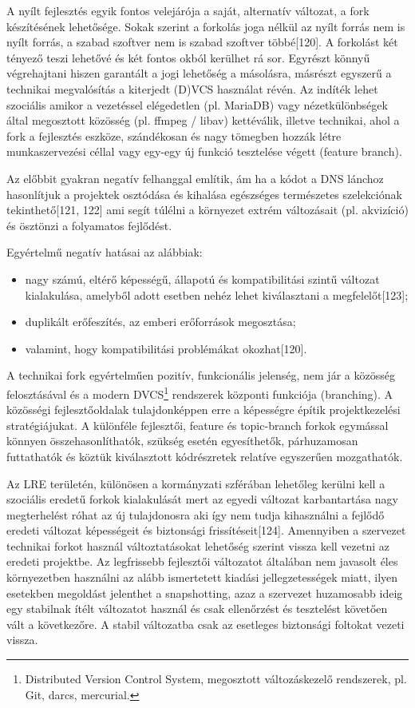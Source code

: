 \documentclass[12pt,magyar,a4paper,oneside]{scrreprt}
\providecommand{\tightlist}{%
  \setlength{\itemsep}{0pt}\setlength{\parskip}{0pt}}
\begin{document}
A nyílt fejlesztés egyik fontos velejárója a saját, alternatív változat,
a fork készítésének lehetősége. Sokak szerint a forkolás joga nélkül az
nyílt forrás nem is nyílt forrás, a szabad szoftver nem is szabad
szoftver többé{[}120{]}. A forkolást két tényező teszi lehetővé és két
fontos okból kerülhet rá sor. Egyrészt könnyű végrehajtani hiszen
garantált a jogi lehetőség a másolásra, másrészt egyszerű a technikai
megvalósítás a kiterjedt (D)VCS használat révén. Az indíték lehet
szociális amikor a vezetéssel elégedetlen (pl. MariaDB) vagy
nézetkülönbségek által megosztott közösség (pl. ffmpeg / libav)
kettéválik, illetve technikai, ahol a fork a fejlesztés eszköze,
szándékosan és nagy tömegben hozzák létre munkaszervezési céllal vagy
egy-egy új funkció tesztelése végett (feature branch).

Az előbbit gyakran negatív felhanggal említik, ám ha a kódot a DNS
lánchoz hasonlítjuk a projektek osztódása és kihalása egészséges
természetes szelekciónak tekinthető{[}121, 122{]} ami segít túlélni a
környezet extrém változásait (pl. akvizíció) és ösztönzi a folyamatos
fejlődést.

Egyértelmű negatív hatásai az alábbiak:

\begin{itemize}
\tightlist
\item
  nagy számú, eltérő képességű, állapotú és kompatibilitási szintű
  változat kialakulása, amelyből adott esetben nehéz lehet kiválasztani
  a megfelelőt{[}123{]};
\item
  duplikált erőfeszítés, az emberi erőforrások megosztása;
\item
  valamint, hogy kompatibilitási problémákat okozhat{[}120{]}.
\end{itemize}

A technikai fork egyértelműen pozitív, funkcionális jelenség, nem jár a
közösség felosztásával és a modern DVCS\footnote{Distributed Version
  Control System, megosztott változáskezelő rendszerek, pl. Git, darcs,
  mercurial.} rendszerek központi funkciója (branching). A közösségi
fejlesztőoldalak tulajdonképpen erre a képességre építik projektkezelési
stratégiájukat. A különféle fejlesztői, feature és topic-branch forkok
egymással könnyen összehasonlíthatók, szükség esetén egyesíthetők,
párhuzamosan futtathatók és köztük kiválasztott kódrészretek relatíve
egyszerűen mozgathatók.

Az LRE területén, különösen a kormányzati szférában lehetőleg kerülni
kell a szociális eredetű forkok kialakulását mert az egyedi változat
karbantartása nagy megterhelést róhat az új tulajdonosra aki így nem
tudja kihasználni a fejlődő eredeti változat képességeit és biztonsági
frissítéseit{[}124{]}. Amennyiben a szervezet technikai forkot használ
változtatásokat lehetőség szerint vissza kell vezetni az eredeti
projektbe. Az legfrissebb fejlesztői változatot általában nem javasolt
éles környezetben használni az alább ismertetett kiadási
jellegzetességek miatt, ilyen esetekben megoldást jelenthet a
snapshotting, azaz a szervezet huzamosabb ideig egy stabilnak ítélt
változatot használ és csak ellenőrzést és tesztelést követően vált a
következőre. A stabil változatba csak az esetleges biztonsági foltokat
vezeti vissza.
\end{document}
